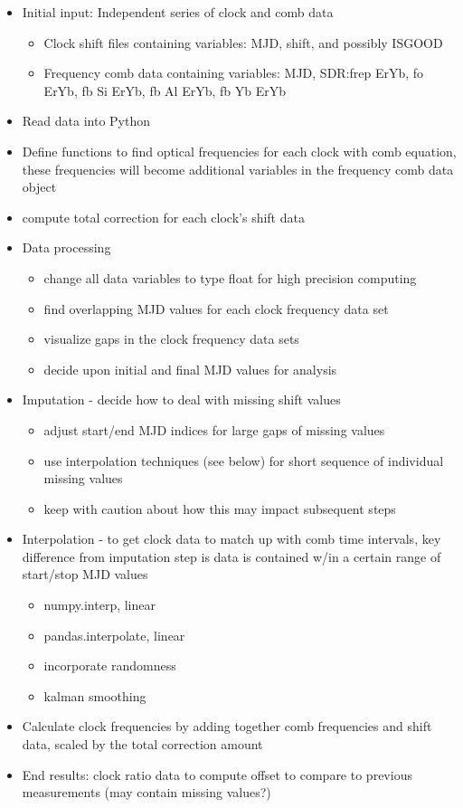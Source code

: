 \documentclass[12pt]{article}
\begin{document}
\begin{itemize}
\item Initial input: Independent series of clock and comb data
\begin{itemize}
	\item Clock shift files containing variables: MJD, shift, and possibly ISGOOD 
	\item Frequency comb data containing variables: MJD, SDR:frep ErYb, fo ErYb, fb Si ErYb, fb Al ErYb, fb Yb ErYb
\end{itemize}
\item Read data into Python
\item Define functions to find optical frequencies for each clock with comb equation, these frequencies will become additional variables in the frequency comb data object 
\item compute total correction for each clock's shift data 
\item Data processing 
\begin{itemize}
	\item change all data variables to type float for high precision computing
	\item find overlapping MJD values for each clock frequency data set 
	\item visualize gaps in the clock frequency data sets 
	\item decide upon initial and final MJD values for analysis  
\end{itemize} 
\item Imputation -  decide how to deal with missing shift values
\begin{itemize}
	\item adjust start/end MJD indices for large gaps of missing values 
	\item use interpolation techniques (see below) for short sequence of individual missing values 
	\item keep with caution about how this may impact subsequent steps 
\end{itemize}
\item Interpolation - to get clock data to match up with comb time intervals, key difference from imputation step is data is contained w/in a certain range of start/stop MJD values 
\begin{itemize}
	\item numpy.interp, linear 
	\item pandas.interpolate, linear 
	\item incorporate randomness 
	\item kalman smoothing 
\end{itemize}
\item Calculate clock frequencies by adding together comb frequencies and shift data, scaled by the total correction amount 
\item End results: clock ratio data to compute offset to compare to previous measurements (may contain missing values?) 
\end{itemize}
\end{document}
